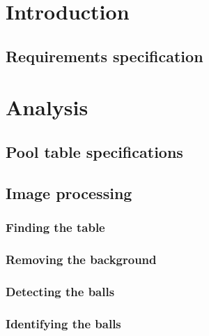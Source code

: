 
\usepackage{float}
\usepackage{graphicx}







\tableofcontents

\chapter{Introduction}
	\section{Requirements specification}
		

\chapter{Analysis}
	\section{Pool table specifications}
		\label{sec:rules}
		

\section{Image processing}
	\subsection{Finding the table}
		

	\subsection{Removing the background}
		

	\subsection{Detecting the balls}
		

	\subsection{Identifying the balls}
		




